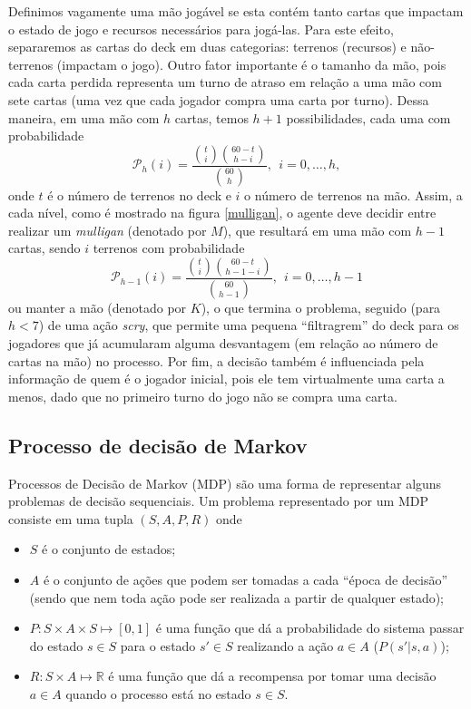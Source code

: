 \documentclass{book}
\begin{document}
Definimos vagamente uma mão jogável se esta contém tanto cartas que impactam o estado de jogo e recursos necessários para jogá-las.
Para este efeito, separaremos as cartas do deck em duas categorias: terrenos (recursos) e não-terrenos (impactam o jogo).
Outro fator importante é o tamanho da mão, pois cada carta perdida representa um turno de atraso em relação a uma mão com sete cartas (uma vez que cada jogador compra
uma carta por turno). Dessa maneira, em uma mão com $h$ cartas, temos $h+1$ possibilidades, cada uma com probabilidade
\[ \mathcal{P}_h(i) = \frac{\binom{t}{i}\binom{60 - t}{h - i}}{\binom{60}{h}}, \ \ i = 0,\ldots, h,\] onde $t$ é o número de terrenos no deck e $i$ o número de terrenos
na mão. Assim, a cada nível, como é mostrado na figura \ref{mulligan}, o agente deve decidir entre realizar um \textit{mulligan}
(denotado por $M$), que resultará em uma mão com $h-1$ cartas, sendo $i$ terrenos com probabilidade
 \[ \mathcal{P}_{h - 1}(i) = \frac{\binom{t}{i}\binom{60 - t}{h - 1 - i}}{\binom{60}{h - 1}}, \ \  i = 0,\ldots, h - 1\]
 ou manter a mão (denotado por $K$), o que termina o problema, seguido (para $h < 7$) de uma ação \textit{scry}, que permite uma pequena ``filtragrem''
 do deck para os jogadores que já acumularam alguma desvantagem (em relação ao número de cartas na mão) no processo. Por fim, a decisão também é influenciada
 pela informação de quem é o jogador inicial, pois ele tem virtualmente uma carta a menos, dado que no primeiro turno do jogo não se compra uma carta.

\subsection{Processo de decisão de Markov}

Processos de Decisão de Markov (MDP) são uma forma de representar alguns problemas de decisão sequenciais. Um problema representado por um MDP consiste em
uma tupla $(S, A, P, R)$ onde
\begin{itemize}
  \item $S$ é o conjunto de estados;
  \item $A$ é o conjunto de ações que podem ser tomadas a cada ``época de decisão'' (sendo que nem toda ação pode ser realizada a partir de qualquer estado);
  \item $P: S \times A \times S \mapsto [0,1]$ é uma função que dá a probabilidade do sistema passar do estado $s \in S$ para o estado $s' \in S$
  realizando a ação $a \in A$ ($P(s'|s, a)$);
  \item $R: S \times A \mapsto \mathbb{R}$ é uma função que dá a recompensa por tomar uma decisão $a \in A$ quando o processo está no estado $s \in S$.
\end{itemize}
\end{document}
